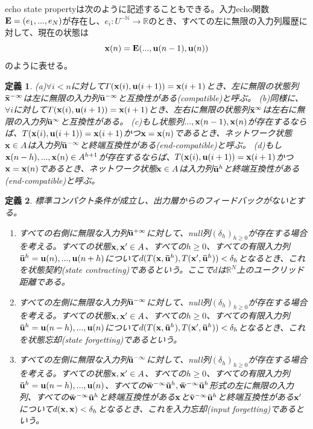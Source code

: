 \documentclass{jsarticle}
\newtheorem{dfn}{定義}
\begin{document}
echo state propertyは次のように記述することもできる。入力echo関数${\bf E}=(e_{1},...,e_{N})$が存在し、$e_{i}:U^{-\mathbb{N}} \rightarrow \mathbb{R}$のとき、すべての左に無限の入力列履歴に対して、現在の状態は
\begin{equation}
	{\bf x}(n)={\bf E}(...,{\bf u}(n-1),{\bf u}(n))
\end{equation}
のように表せる。
\begin{dfn}
(a)$\forall i< n$に対して$T({\bf x}(i),{\bf u}(i+1))={\bf x}(i+1)$とき、左に無限の状態列${\bf \bar x}^{- \infty}$は左に無限の入力列${\bf \bar u}^{- \infty}$と互換性がある(compatible)と呼ぶ。
(b)同様に、$\forall i$に対して$T({\bf x}(i),{\bf u}(i+1))={\bf x}(i+1)$とき、左右に無限の状態列${\bf \bar x}^{\infty}$は左右に無限の入力列${\bf \bar u}^{\infty}$と互換性がある。
(c)もし状態列$...,{\bf x}(n-1),{\bf x}(n)$が存在するならば、$T({\bf x}(i),{\bf u}(i+1))={\bf x}(i+1)$かつ${\bf x}={\bf x}(n)$であるとき、ネットワーク状態${\bf x}\in A$は入力列${\bf \bar u}^{- \infty}$と終端互換性がある(end-compatible)と呼ぶ。
(d)もし${\bf x}(n-h),...,{\bf x}(n) \in A^{h+1}$が存在するならば、$T({\bf x}(i),{\bf u}(i+1))={\bf x}(i+1)$かつ${\bf x}={\bf x}(n)$であるとき、ネットワーク状態${\bf x} \in A$は入力列${\bf \bar u}^{h}$と終端互換性がある(end-compatible)と呼ぶ。
\end{dfn}
\begin{dfn}
標準コンパクト条件が成立し、出力層からのフィードバックがないとする。
\begin{enumerate}
\item すべての右側に無限な入力列${\bf \bar u}^{+ \infty}$に対して、null列$(\delta_{h})_{{h}\geq 0}$が存在する場合を考える。すべての状態${\bf x},{\bf x'} \in A$、すべての$h \geq 0$、すべての有限入力列${\bf \bar u}^{h}={\bf u}(n),...,{\bf u}(n+h)$について$d(T({\bf x},{\bf \bar u}^{h}),T({\bf x'},{\bf \bar u}^{h}))<\delta_{h}$となるとき、これを状態契約(state contracting)であるという。ここで$d$は$\mathbb{R}^{N}$上のユークリッド距離である。

\item すべての左側に無限な入力列${\bf \bar u}^{- \infty}$に対して、null列$(\delta_{h})_{{h}\geq 0}$が存在する場合を考える。すべての状態${\bf x},{\bf x'} \in A$、すべての$h \geq 0$、すべての有限入力列${\bf \bar u}^{h}={\bf u}(n-h),...,{\bf u}(n)$について$d(T({\bf x},{\bf \bar u}^{h}),T({\bf x'},{\bf \bar u}^{h}))<\delta_{h}$となるとき、これを状態忘却(state forgetting)であるという。

\item すべての左側に無限な入力列${\bf \bar u}^{- \infty}$に対して、null列$(\delta_{h})_{{h}\geq 0}$が存在する場合を考える。すべての状態${\bf x},{\bf x'} \in A$、すべての$h \geq 0$、すべての有限入力列${\bf \bar u}^{h}={\bf u}(n-h),...,{\bf u}(n)$、すべての${\bf \bar w^{- \infty}}{\bf \bar u}^{h},{\bf \bar w^{- \infty}}{\bf \bar u}^{h}$形式の左に無限の入力列、すべての${\bf \bar w^{- \infty}}{\bf \bar u}^{h}$と終端互換性がある${\bf x}$と${\bf \bar v^{- \infty}}{\bf \bar u}^{h}$と終端互換性がある${\bf x'}$について$d({\bf x},{\bf x})<\delta_{h}$となるとき、これを入力忘却(input forgetting)であるという。
\end{enumerate}
\end{dfn}
\end{document}
